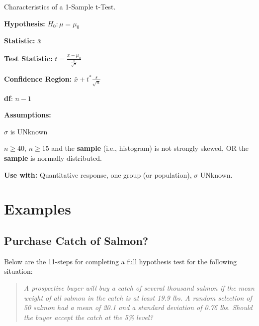 \documentclass[10pt,openany]{book}\usepackage[]{graphicx}\usepackage[]{color}
\begin{document}
\begin{table}[h]
\centering
\colorbox{ltgray}{
\begin{minipage}{.75\textwidth}
  \centering
	\caption{Characteristics of a 1-Sample t-Test.}\label{tab:1tspec}
  \begin{Itemize}
    \vspace*{-6pt}
      \item \textbf{Hypothesis:} $H_{0}:\mu=\mu_{0}$
      \item \textbf{Statistic:} $\bar{x}$
      \vspace{4pt}
      \item \textbf{Test Statistic:} $t=\frac{\bar{x}-\mu_{0}}{\frac{s}{\sqrt{n}}}$
      \vspace{4pt}
      \item \textbf{Confidence Region:} $\bar{x}+t^{*}\frac{s}{\sqrt{n}}$
      \item \textbf{df}: $n-1$
      \item \textbf{Assumptions:}
        \begin{Enumerate}
          \item $\sigma$ is UNknown
          \item $n\geq40$, $n\geq15$ and the \textbf{sample} (i.e., histogram) is not strongly skewed, OR the \textbf{sample} is normally distributed.
        \end{Enumerate}
      \item \textbf{Use with:} Quantitative response, one group (or population), $\sigma$ UNknown.
  \end{Itemize}
\end{minipage}}
\end{table}

\section{Examples}
\vspace{-8pt}
\subsection{Purchase Catch of Salmon?}
Below are the 11-steps  for completing a full hypothesis test for the following situation:
\begin{quote}
\textsl{A prospective buyer will buy a catch of several thousand salmon if the mean weight of all salmon in the catch is at least 19.9 lbs. A random selection of 50 salmon had a mean of 20.1 and a standard deviation of 0.76 lbs. Should the buyer accept the catch at the 5\% level?}
\end{quote}
\vspace*{-12pt}
\end{document}
